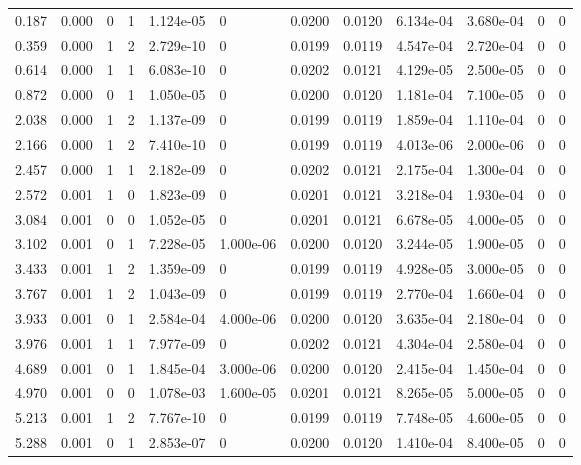 \documentclass[preview]{standalone}
\begin{document}
{{\begin{tabular}{L{1.2cm}C{1.2cm} C{0.3cm}C{0.5cm} C{1.4cm}C{1.4cm} C{1.4cm}C{1.4cm} C{1.6cm}C{1.6cm} C{1.6cm}C{1.6cm}}
  0.187  &  0.000  & 0     &  1 &  1.124e-05  & 0  &  0.0200&   0.0120& 6.134e-04 & 3.680e-04   &  0 & 0  \\ 
  0.359  &  0.000  & 1     &  2 &  2.729e-10  & 0  &  0.0199&   0.0119& 4.547e-04 & 2.720e-04   &  0 & 0  \\ 
  0.614  &  0.000  & 1     &  1 &  6.083e-10  & 0  &  0.0202&   0.0121& 4.129e-05 & 2.500e-05   &  0 & 0  \\ 
  0.872  &  0.000  & 0     &  1 &  1.050e-05  & 0  &  0.0200&   0.0120& 1.181e-04 & 7.100e-05   &  0 & 0  \\ 
  2.038  &  0.000  & 1     &  2 &  1.137e-09  & 0  &  0.0199&   0.0119& 1.859e-04 & 1.110e-04   &  0 & 0  \\ 
  2.166  &  0.000  & 1     &  2 &  7.410e-10  & 0  &  0.0199&   0.0119& 4.013e-06 & 2.000e-06   &  0 & 0  \\ 
  2.457  &  0.000  & 1     &  1 &  2.182e-09  & 0  &  0.0202&   0.0121& 2.175e-04 & 1.300e-04   &  0 & 0  \\ 
  2.572  &  0.001  & 1     &  0 &  1.823e-09  & 0  &  0.0201&   0.0121& 3.218e-04 & 1.930e-04   &  0 & 0  \\ 
  3.084  &  0.001  & 0     &  0 &  1.052e-05  & 0  &  0.0201&   0.0121& 6.678e-05 & 4.000e-05   &  0 & 0  \\ 
  3.102  &  0.001  & 0     &  1 &  7.228e-05  & 1.000e-06  &  0.0200&   0.0120& 3.244e-05 & 1.900e-05   &  0 & 0  \\ 
  3.433  &  0.001  & 1     &  2 &  1.359e-09  & 0  &  0.0199&   0.0119& 4.928e-05 & 3.000e-05   &  0 & 0  \\ 
  3.767  &  0.001  & 1     &  2 &  1.043e-09  & 0  &  0.0199&   0.0119& 2.770e-04 & 1.660e-04   &  0 & 0  \\ 
  3.933  &  0.001  & 0     &  1 &  2.584e-04  & 4.000e-06  &  0.0200&   0.0120& 3.635e-04 & 2.180e-04   &  0 & 0  \\ 
  3.976  &  0.001  & 1     &  1 &  7.977e-09  & 0  &  0.0202&   0.0121& 4.304e-04 & 2.580e-04   &  0 & 0  \\ 
  4.689  &  0.001  & 0     &  1 &  1.845e-04  & 3.000e-06  &  0.0200&   0.0120& 2.415e-04 & 1.450e-04   &  0 & 0  \\ 
  4.970  &  0.001  & 0     &  0 &  1.078e-03  & 1.600e-05  &  0.0201&   0.0121& 8.265e-05 & 5.000e-05   &  0 & 0  \\ 
  5.213  &  0.001  & 1     &  2 &  7.767e-10  & 0  &  0.0199&   0.0119& 7.748e-05 & 4.600e-05   &  0 & 0  \\ 
  5.288  &  0.001  & 0     &  1 &  2.853e-07  & 0  &  0.0200&   0.0120& 1.410e-04 & 8.400e-05   &  0 & 0  \\ 

\end{tabular}}}
\end{document}
